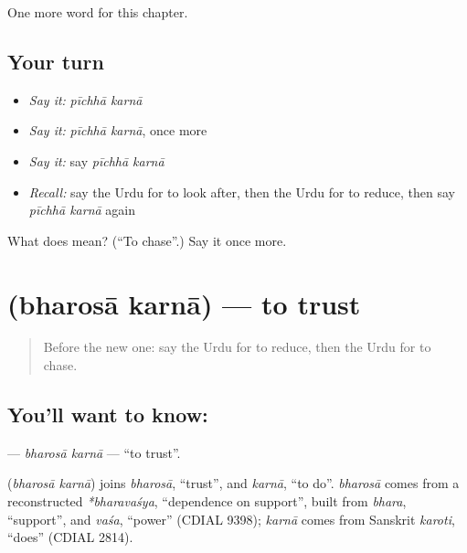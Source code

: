 \begin{grammarlens}[title={What you've built}]
One more word for this chapter.
\end{grammarlens}

\subsection*{Your turn}
\begin{itemize}
\raggedright
  \item \emph{Say it:} \emph{pīchhā karnā}
  \item \emph{Say it:} \emph{pīchhā karnā}, once more
  \item \emph{Say it:} say \emph{pīchhā karnā}
  \item \emph{Recall:} say the Urdu for to look after, then the Urdu for to reduce, then say \emph{pīchhā karnā} again
\end{itemize}

\begin{tcolorbox}[breakable,colback=teal!4,colframe=teal!35!black,title={Before you move on}]
What does   mean? (\textquotedblleft{}To chase\textquotedblright{}.) Say it once more.
\end{tcolorbox}
\section[\texorpdfstring{\ur{بھروسا} \ur{کرنا} (bharosā karnā)}{بھروسا کرنا (bharosā karnā)}]{  (bharosā karnā) — to trust}

\label{lesson:UR-C215-bharosa-karna}



\begin{quote}
Before the new one: say the Urdu for to reduce, then the Urdu for to chase.
\end{quote}

\subsection*{You'll want to know:  }
\textbf{ } — \emph{bharosā karnā} — \textquotedblleft{}to trust\textquotedblright{}.

\begin{cousinweb}
\textbf{ } (\emph{bharosā karnā}) joins \emph{bharosā}, \textquotedblleft{}trust\textquotedblright{}, and \emph{karnā}, \textquotedblleft{}to do\textquotedblright{}. \emph{bharosā} comes from a reconstructed \emph{*bharavaśya}, \textquotedblleft{}dependence on support\textquotedblright{}, built from \emph{bhara}, \textquotedblleft{}support\textquotedblright{}, and \emph{vaśa}, \textquotedblleft{}power\textquotedblright{} (CDIAL 9398); \emph{karnā} comes from Sanskrit \emph{karoti}, \textquotedblleft{}does\textquotedblright{} (CDIAL 2814).
\end{cousinweb}

